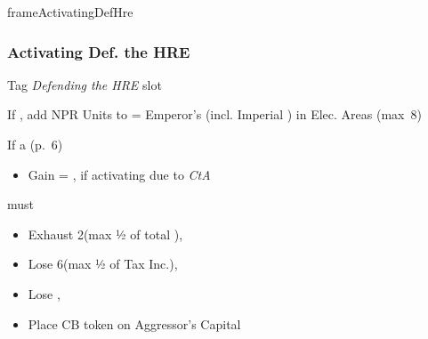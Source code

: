 \documentclass[10pt]{article}
\newlength{\fhActivatingDefHre} \setlength\fhActivatingDefHre{14\baselineskip}
\begin{document}
\begin{dynamiccontents*}{frameActivatingDefHre}\begin{eubox}{\fhActivatingDefHre}
	\subsubsection*{Activating Def. the HRE }
	\begin{itemize}
		\item Tag \emph{Defending the HRE} slot
		\item If , add NPR Units to  \manpower = Emperor's \influence (incl. Imperial \influence) in Elec. Areas (max~8)
		{\botrules
		\item If a  (p.~6)
		\begin{itemize}
			\item Gain \botpower = \authority, if activating due to \emph{CtA}
		\end{itemize}
		}
		\item {} must
		\begin{itemize}
			\item Exhaust 2\manpower (max ½ of total \manpower), 
			\item Lose 6\ducats (max ½ of Tax Inc.), 
			\item Lose , 
			\item Place CB token on Aggressor's Capital
		\end{itemize}
		\item {}
	\end{itemize}
\end{eubox}\end{dynamiccontents*}
\end{document}
